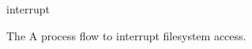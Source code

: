\documentclass{article}
\def\gpicbox#1{%
\vbox{\unvbox\csname #1\endcsname\kern 0pt}}
\newcommand{\gpicfig}[2]{%

\begin{figure}
\begin{center}
\leavevmode
\gpicbox{#1}
\caption{#2}
\label{fig:#1}
\end{center}
\end{figure}
}
\begin{document}
\gpicfig{interrupt}{The A process flow to interrupt filesystem access.}
\end{document}
